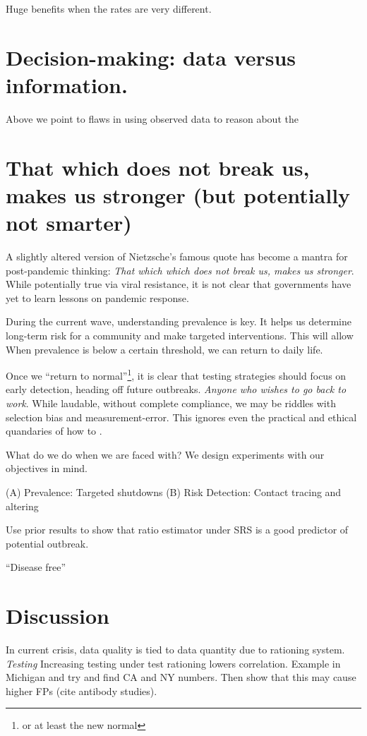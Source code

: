 \documentclass[11pt]{amsart}
\begin{document}
Huge benefits when the rates are very different.

\section{Decision-making: data versus information.}

Above we point to flaws in using observed data to reason about the

\section{That which does not break us, makes us stronger (but potentially not smarter)}

A slightly altered version of Nietzsche's famous quote has become a mantra for post-pandemic thinking: \emph{That which which does not break us, makes us stronger}.  While potentially true via viral resistance, it is not clear that governments have yet to learn lessons on pandemic response.

During the current wave, understanding prevalence is key.  It helps us determine long-term risk for a community and make targeted interventions.  This will allow
When prevalence is below a certain threshold, we can return to daily life.

Once we ``return to normal''\footnote{or at least the new normal}, it is clear that testing strategies should focus on early detection, heading off future outbreaks.
\emph{Anyone who wishes to go back to work}.  While laudable, without complete compliance, we may be riddles with selection bias and measurement-error.  This ignores even the practical and ethical quandaries of how to .

What do we do when we are faced with?  We design experiments with our objectives in mind.

(A) Prevalence: Targeted shutdowns
(B) Risk Detection: Contact tracing and altering

Use prior results to show that ratio estimator under SRS is a good predictor of potential outbreak.

``Disease free''


\section{Discussion}

In current crisis, data quality is tied to data quantity due to rationing system. \emph{Testing }
Increasing testing under test rationing lowers correlation.  Example in Michigan and try and find CA and NY numbers.  Then show that this may cause higher FPs (cite antibody studies).
\end{document}
